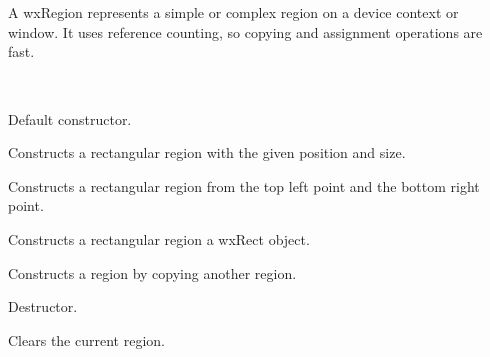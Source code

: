 \section{}\label{wxregion}

A wxRegion represents a simple or complex region on a device context or window. It uses
reference counting, so copying and assignment operations are fast.


\\




\label{wxregionconstr}


Default constructor.


Constructs a rectangular region with the given position and size.


Constructs a rectangular region from the top left point and the bottom right point.


Constructs a rectangular region a wxRect object.


Constructs a region by copying another region.



Destructor.

\label{wxregionclear}


Clears the current region.

\label{wxregioncontains}


